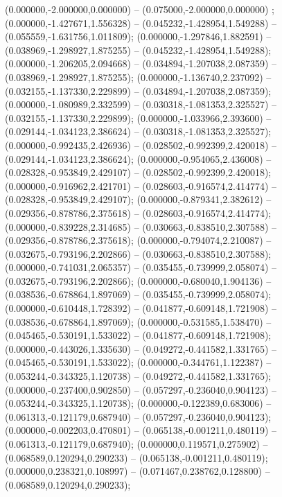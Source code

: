  (0.000000,-2.000000,0.000000) -- (0.075000,-2.000000,0.000000) ;
 (0.000000,-1.427671,1.556328) -- (0.045232,-1.428954,1.549288) -- (0.055559,-1.631756,1.011809);
 (0.000000,-1.297846,1.882591) -- (0.038969,-1.298927,1.875255) -- (0.045232,-1.428954,1.549288);
 (0.000000,-1.206205,2.094668) -- (0.034894,-1.207038,2.087359) -- (0.038969,-1.298927,1.875255);
 (0.000000,-1.136740,2.237092) -- (0.032155,-1.137330,2.229899) -- (0.034894,-1.207038,2.087359);
 (0.000000,-1.080989,2.332599) -- (0.030318,-1.081353,2.325527) -- (0.032155,-1.137330,2.229899);
 (0.000000,-1.033966,2.393600) -- (0.029144,-1.034123,2.386624) -- (0.030318,-1.081353,2.325527);
 (0.000000,-0.992435,2.426936) -- (0.028502,-0.992399,2.420018) -- (0.029144,-1.034123,2.386624);
 (0.000000,-0.954065,2.436008) -- (0.028328,-0.953849,2.429107) -- (0.028502,-0.992399,2.420018);
 (0.000000,-0.916962,2.421701) -- (0.028603,-0.916574,2.414774) -- (0.028328,-0.953849,2.429107);
 (0.000000,-0.879341,2.382612) -- (0.029356,-0.878786,2.375618) -- (0.028603,-0.916574,2.414774);
 (0.000000,-0.839228,2.314685) -- (0.030663,-0.838510,2.307588) -- (0.029356,-0.878786,2.375618);
 (0.000000,-0.794074,2.210087) -- (0.032675,-0.793196,2.202866) -- (0.030663,-0.838510,2.307588);
 (0.000000,-0.741031,2.065357) -- (0.035455,-0.739999,2.058074) -- (0.032675,-0.793196,2.202866);
 (0.000000,-0.680040,1.904136) -- (0.038536,-0.678864,1.897069) -- (0.035455,-0.739999,2.058074);
 (0.000000,-0.610448,1.728392) -- (0.041877,-0.609148,1.721908) -- (0.038536,-0.678864,1.897069);
 (0.000000,-0.531585,1.538470) -- (0.045465,-0.530191,1.533022) -- (0.041877,-0.609148,1.721908);
 (0.000000,-0.443026,1.335630) -- (0.049272,-0.441582,1.331765) -- (0.045465,-0.530191,1.533022);
 (0.000000,-0.344761,1.122387) -- (0.053244,-0.343325,1.120738) -- (0.049272,-0.441582,1.331765);
 (0.000000,-0.237400,0.902850) -- (0.057297,-0.236040,0.904123) -- (0.053244,-0.343325,1.120738);
 (0.000000,-0.122389,0.683006) -- (0.061313,-0.121179,0.687940) -- (0.057297,-0.236040,0.904123);
 (0.000000,-0.002203,0.470801) -- (0.065138,-0.001211,0.480119) -- (0.061313,-0.121179,0.687940);
 (0.000000,0.119571,0.275902) -- (0.068589,0.120294,0.290233) -- (0.065138,-0.001211,0.480119);
 (0.000000,0.238321,0.108997) -- (0.071467,0.238762,0.128800) -- (0.068589,0.120294,0.290233);
